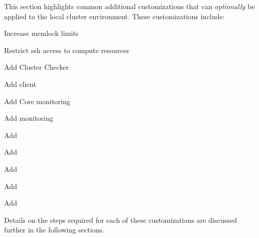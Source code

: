 This section highlights common additional customizations that can {\em
optionally} be applied to the local cluster environment. These customizations
include:

\begin{multicols}{2}
\begin{itemize*}
\item Increase memlock limits
\item Restrict ssh access to compute resources
\item Add Cluster Checker
\item Add \Lustre{} client
\item Add \Nagios{} Core monitoring
\item Add \Ganglia{} monitoring
\item Add \clustershell{}
\item Add \mrsh{}
\item Add \genders{}
\item Add \powerman{}
\item Add \conman{}  
\end{itemize*}
\end{multicols}

\noindent Details on the steps required for each of these customizations are
discussed further in the following sections.
